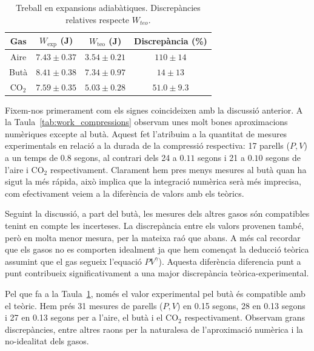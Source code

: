 \documentclass[a4paper,twoside,12pt]{article}
\theoremstyle{definition}
\begin{document}
	\begin{table}[h]
		\centering
		\caption{Treball en expansions adiabàtiques. Discrepàncies relatives respecte $W_{teo}$.}
		\begin{tabular}{|c|ccc|}
			\hline
			Gas & $W_{\mathrm{exp}}$ (J) & $W_{\mathrm{teo}}$ (J) & Discrepància (\%) \\
			\hline
			Aire & $7.43 \pm 0.37$ & $3.54 \pm 0.21$ & $110 \pm 14$ \\
			Butà & $8.41 \pm 0.38$ & $7.34 \pm 0.97$ & $14 \pm 13$ \\
			CO$_2$ & $7.59\pm 0.35$ & $5.03\pm 0.28$ & $51.0 \pm 9.3$ \\
			\hline
		\end{tabular}
		\label{tab:work_expansions}
	\end{table}
	
	Fixem-nos primerament com els signes coincideixen amb la discussió anterior. A la Taula~\ref{tab:work_compressions} observam unes molt bones aproximacions numèriques excepte al butà. Aquest fet l'atribuim a la quantitat de mesures experimentals en relació a la durada de la compressió respectiva: 17 parells ($P,V$) a un temps de $0.8$ segons, al contrari dels 24 a $0.11$ segons i 21 a $0.10$ segons de l'aire i CO$_2$ respectivament. Clarament hem pres menys mesures al butà quan ha sigut la més rápida, això implica que la integració numèrica serà més imprecisa, com efectivament veiem a la diferència de valors amb els teòrics.
	
	 Seguint la discussió, a part del butà, les mesures dels altres gasos són compatibles tenint en compte les incerteses. La discrepància entre els valors provenen també, però en molta menor mesura, per la mateixa raó que abans. A més cal recordar que els gasos no es comporten idealment ja que hem començat la deducció teòrica assumint que el gas segueix l'equació $PV^{\gamma}$). Aquesta diferència diferencia punt a punt contribueix significativament a una major discrepància teòrica-experimental.
	
	Pel que fa a la Taula~\ref{tab:work_expansions}, només el valor experimental pel butà és compatible amb  el teòric. Hem prés 31 mesures de parells ($P,V$) en 0.15 segons, 28 en 0.13 segons i 27 en 0.13 segons per a l'aire, el butà i el CO$_2$ respectivament.	Observam grans discrepàncies, entre altres raons per la naturalesa de l'aproximació numèrica i la no-idealitat dels gasos.
	
	
	\newpage
\end{document}
